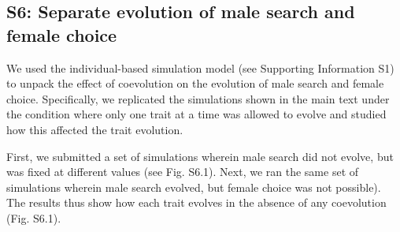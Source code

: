 \documentclass[
]{article}
\begin{document}
\clearpage

\hypertarget{s6-separate-evolution-of-male-search-and-female-choice}{%
\subsection{S6: Separate evolution of male search and female
choice}\label{s6-separate-evolution-of-male-search-and-female-choice}}

We used the individual-based simulation model (see Supporting
Information S1) to unpack the effect of coevolution on the evolution of
male search and female choice. Specifically, we replicated the
simulations shown in the main text under the condition where only one
trait at a time was allowed to evolve and studied how this affected the
trait evolution.

First, we submitted a set of simulations wherein male search did not
evolve, but was fixed at different values (see Fig. S6.1). Next, we ran
the same set of simulations wherein male search evolved, but female
choice was not possible). The results thus show how each trait evolves
in the absence of any coevolution (Fig. S6.1).

\captionsetup{labelformat=empty}
\end{document}
